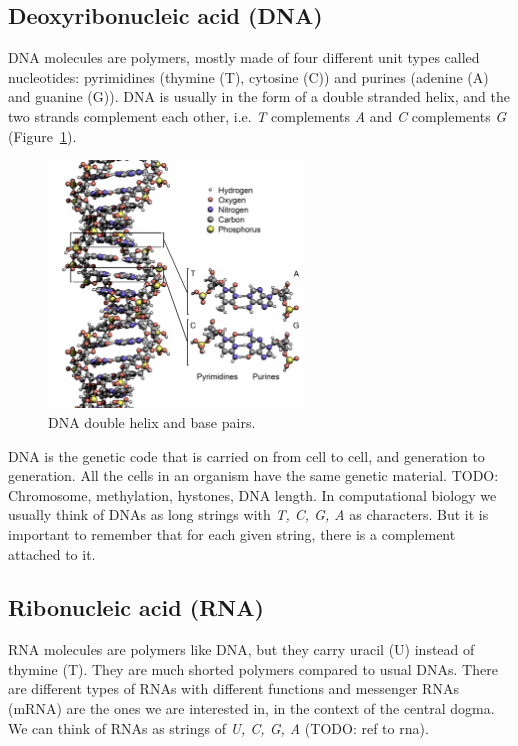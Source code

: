 \subsection{Deoxyribonucleic acid (DNA)}
DNA molecules are polymers, mostly made of four different unit types called nucleotides: pyrimidines (thymine (T), cytosine (C)) and purines (adenine (A) and guanine (G)). DNA is usually in the form of a double stranded helix, and the two strands complement each other, i.e. \emph{T} complements \emph{A} and \emph{C} complements \emph{G} (Figure~\ref{fig:bkg:dna-basic}).

\begin{figure}[!ht]
  \centering
  \includegraphics[width=0.6\textwidth]{figs/background/simplified_DNA_Structure_Key_Labelled_pn_NoBB}
  \caption{DNA double helix and base pairs\protect\footnotemark.}
  \label{fig:bkg:dna-basic}
\end{figure}

DNA is the genetic code that is carried on from cell to cell, and generation to generation. All the cells in an organism have the same genetic material. TODO: Chromosome, methylation, hystones, DNA length. In computational biology we usually think of DNAs as long strings with \emph{T, C, G, A} as characters. But it is important to remember that for each given string, there is a complement attached to it.

\subsection{Ribonucleic acid (RNA)}
RNA molecules are polymers like DNA, but they carry uracil (U) instead of thymine (T). They are much shorted polymers compared to usual DNAs. There are different types of RNAs with different functions and messenger RNAs (mRNA) are the ones we are interested in, in the context of the central dogma. We can think of RNAs as strings of \emph{U, C, G, A} (TODO: ref to rna).

